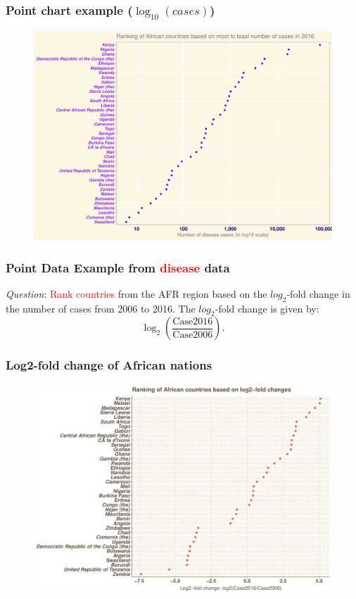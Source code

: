\documentclass{beamer}
\begin{document}
\begin{frame}\frametitle{Point chart example ($\log_{10}{(cases)}$)}
\begin{figure}
\includegraphics[width=0.99\linewidth]{PlotsLec1/Disease2016PointChart2}
\end{figure}
\end{frame}


\begin{frame}\frametitle{Point Data Example from \textcolor{red}{disease} data}
\Large
\textit{Question}: \textcolor{red}{Rank countries} from the AFR region based on the $log_{2}$-fold change in the number of cases from 2006 to 2016. The $log_{2}$-fold change is given by: $$\log_{2}{\left(\frac{\text{Case}2016}{\text{Case}2006}\right)}.$$
\end{frame}


\begin{frame}\frametitle{Log2-fold change of African nations}
\begin{figure}
\includegraphics[width=0.99\linewidth]{PlotsLec1/LogfoldChangePointChart}
\end{figure}
\end{frame}
\end{document}
